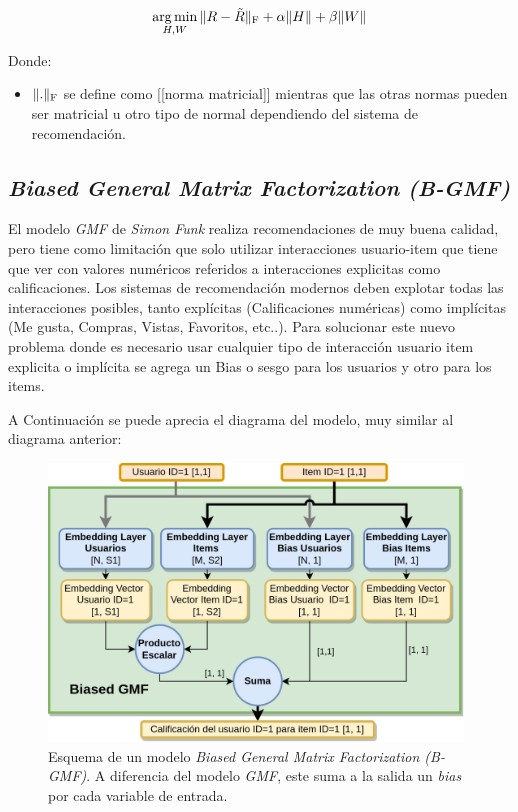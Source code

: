 \documentclass[11pt,a4paper,twoside]{thesis}
\begin{document}
\begin{equation}
\underset{H, W}{\operatorname{arg\,min}}\, \|R - \tilde{R}\|_{\rm F} + \alpha\|H\| + \beta\|W\|
\end{equation}
\begin{description}
\item[Donde:]
\end{description}
\begin{itemize}
\item $\|.\|_{\rm F}$ se define como [[norma matricial]] mientras que las otras normas pueden ser matricial u otro tipo de normal dependiendo del sistema de recomendación.
\end{itemize}

\subsection{\textit{Biased General Matrix Factorization (B-GMF)}}

El modelo \textit{GMF} de \textit{Simon Funk} realiza recomendaciones de muy buena calidad, pero tiene como limitación que solo utilizar interacciones usuario-item que tiene que ver con valores numéricos referidos a interacciones explicitas como calificaciones. Los sistemas de recomendación modernos deben explotar todas las interacciones posibles, tanto explícitas (Calificaciones numéricas) como implícitas (Me gusta, Compras, Vistas, Favoritos, etc..). Para solucionar este nuevo problema donde es necesario usar cualquier tipo de interacción usuario item explicita o implícita se agrega un Bias o sesgo para los usuarios y otro para los items.

A Continuación se puede aprecia el diagrama del modelo, muy similar al diagrama anterior:

\begin{figure}[h!]
	\centering
	\includegraphics[width=11cm]{./images/Biased-GMF.png}
	\caption{
		Esquema de un modelo \textit{Biased General Matrix Factorization (B-GMF)}. A diferencia del modelo \textit{GMF}, este suma a la salida un \textit{bias} por cada variable de entrada.
	}
	\label{fig:BiasedGMFModel}
\end{figure}
\end{document}
